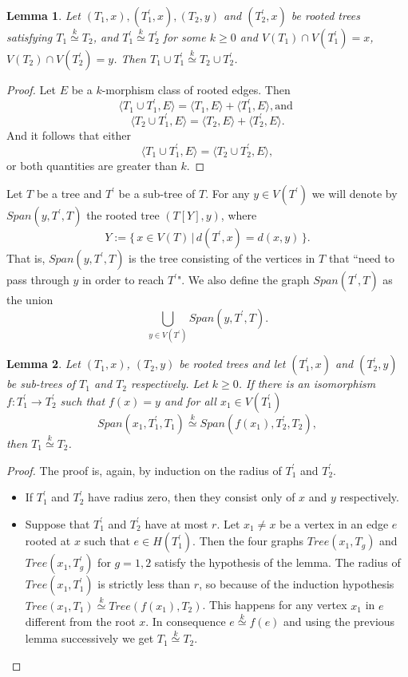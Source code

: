 \documentclass[11pt,notitlepage,a4paper]{article}
\newtheorem{lemma}{Lemma}[section]
\theoremstyle{definition}
\newcommand{\morph}[1]{\stackrel{#1}{\simeq}}
\begin{document}
\begin{lemma}\label{lem:addtrees}
	Let $(T_1,x),(T^\prime_1,x), (T_2, y)$ and $(T^\prime_2,x)$ 
	be rooted trees satisfying $T_1\morph{k} T_2$, and 
	$T_1^\prime\morph{k} T_2^\prime$ for some 
	$k\geq 0$ and $V(T_1)\cap V(T_1^\prime)=x$, 
	$V(T_2)\cap V(T_2^\prime)=y$. Then
	$T_1\cup T_1^\prime \morph{k} T_2\cup T_2^\prime$.
\end{lemma}
\begin{proof}
	Let $E$ be a $k$-morphism class of rooted edges. Then
	\[\langle T_1\cup T_1^\prime,E \rangle = \langle T_1,E \rangle + \langle T_1^\prime,E \rangle , \text{and }\]
	\[\langle T_2\cup T_1^\prime,E \rangle = \langle T_2,E \rangle + \langle T_2^\prime,E \rangle .\]
	And it follows that either
	\[\langle T_1\cup T_1^\prime,E \rangle =\langle T_2\cup T_2^\prime,E \rangle ,\]
	or both quantities are greater than $k$. 
\end{proof}


Let $T$ be a tree and $T^\prime$ be a sub-tree of $T$. For any 
$y\in V(T^\prime)$ we will denote by $Span(y, T^\prime, T)$ the 
rooted tree $(T[Y],y)$, where
\[ Y:= \{ \, x\in V(T) \, | \, d(T^\prime,x)=d(x,y) \,  \}	.\]
That is, $Span(y, T^\prime, T)$ is the tree consisting of the vertices
in $T$ that ``need to pass through $y$ in order to reach $T^\prime$".
We also define the graph $Span(T^\prime, T)$ as the union 
\[ \bigcup_{y\in V(T^\prime)} Span(y,T^\prime, T).  \]

\begin{lemma} \label{lem:isosubtree}
	Let $(T_1,x)$, $(T_2, y)$ be rooted trees and let 
	$(T^\prime_1,x)$ and $(T^\prime_2,y)$ be sub-trees of 
	$T_1$ and $T_2$ respectively. Let $k\geq 0$.
	If there is an isomorphism 
	$f:T^\prime_1 \rightarrow T^\prime_2$ such that $f(x)=y$ and
	for all $x_1\in V(T^\prime_1)$
	\[ Span(x_1,T^\prime_1,T_1)\morph{k} Span(f(x_1),T^\prime_2,T_2),\]
	then $T_1\morph{k}T_2$. 
\end{lemma}
\begin{proof}
	The proof is, again, by induction on the radius of $T^\prime_1$ and $T^\prime_2$.
	\begin{itemize}[leftmargin=*]
		\item If $T^\prime_1$ and $T^\prime_2$ have radius zero, then they consist only of
		$x$ and $y$ respectively. 
		\item Suppose that $T^\prime_1$ and $T^\prime_2$ have at most $r$. Let $x_1\neq x$ be
		a vertex in an edge $e$ rooted at $x$ such that $e\in H(T^\prime_1)$.
		Then the four graphs $Tree(x_1, T_g)$ and $Tree(x_1,T^\prime_g)$ 
		for $g=1,2$ satisfy the hypothesis of the lemma.
		The radius of $Tree(x_1,T^\prime_1)$ is strictly less than $r$, so 
		because of the induction
		hypothesis $Tree(x_1, T_1)\morph{k} Tree(f(x_1),T_2)$. 
		This happens for any vertex $x_1$ in $e$ different from the root $x$.
		In consequence $e\morph{k}f(e)$ 
		and using the previous lemma successively we get $T_1\morph{k} T_2$.
	\end{itemize}
\end{proof}
\end{document}
